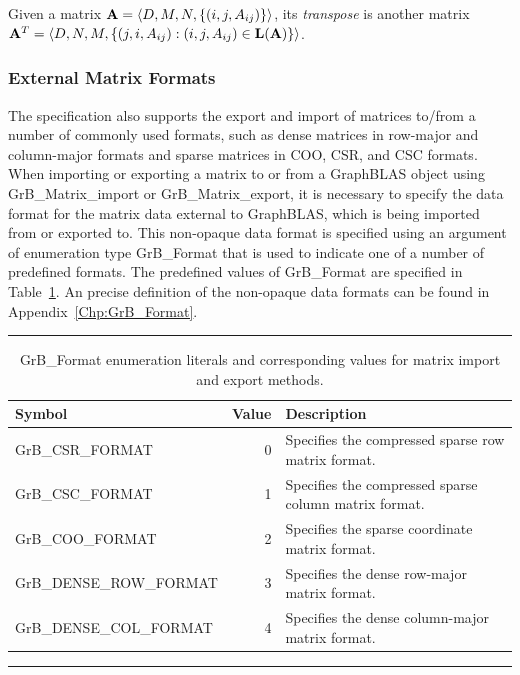 Given a matrix ${\bf A} = \langle D, M, N, \{ (i,j,A_{ij}) \} \rangle$,
its \emph{transpose} is another matrix ${\bf A}^T = \langle D, N, M, \{
(j,i,A_{ij}) : (i,j,A_{ij}) \in \mathbf{L}({\bf A}) \} \rangle$.

\subsubsection{External Matrix Formats}

The specification also supports the export and import of matrices to/from a 
number of commonly used formats, such as dense matrices in row-major and 
column-major formats and sparse matrices in COO, CSR, and CSC formats.  When
importing or exporting a matrix to or from a GraphBLAS object using
{\sf GrB\_Matrix\_import} or {\sf GrB\_Matrix\_export}, it is necessary to
specify the data format for the matrix data external to GraphBLAS, which is
being imported from or exported to.  This non-opaque data format is specified
using an argument of enumeration type {\sf GrB\_Format} that is used to 
indicate one of a number of predefined formats.  The predefined values of 
{\sf GrB\_Format} are specified in Table~\ref{Tab:MatrixFormatEnumerationValues}.  
An precise definition of the non-opaque data formats can be found in 
Appendix~\ref{Chp:GrB_Format}.


\begin{table}[bh]
\hrule
\begin{center}
\caption{{\sf GrB\_Format} enumeration literals and corresponding values for 
matrix import and export methods.}
\label{Tab:MatrixFormatEnumerationValues}

\begin{tabular}{l|r|p{3.5in}}
Symbol    & Value & Description \\ \hline
{\sf GrB\_CSR\_FORMAT} & 0 & Specifies the compressed sparse row matrix format.\\
{\sf GrB\_CSC\_FORMAT} & 1 & Specifies the compressed sparse column matrix format.\\
{\sf GrB\_COO\_FORMAT} & 2 & Specifies the sparse coordinate matrix format.\\
{\sf GrB\_DENSE\_ROW\_FORMAT} & 3 & Specifies the dense row-major matrix format.\\
{\sf GrB\_DENSE\_COL\_FORMAT} & 4 & Specifies the dense column-major matrix format.\\
\end{tabular}

\end{center}
\hrule
\end{table}


